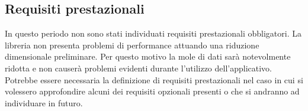 \subsection{Requisiti prestazionali}

In questo periodo non sono stati individuati requisiti prestazionali obbligatori. La libreria  non presenta problemi di performance attuando una riduzione dimensionale preliminare. Per questo motivo la mole di dati sarà notevolmente ridotta e non causerà problemi evidenti durante l'utilizzo dell'applicativo.\\
Potrebbe essere necessaria la definizione di requisiti prestazionali nel caso in cui si volessero
approfondire alcuni dei requisiti opzionali presenti o che si andranno ad individuare in futuro. 